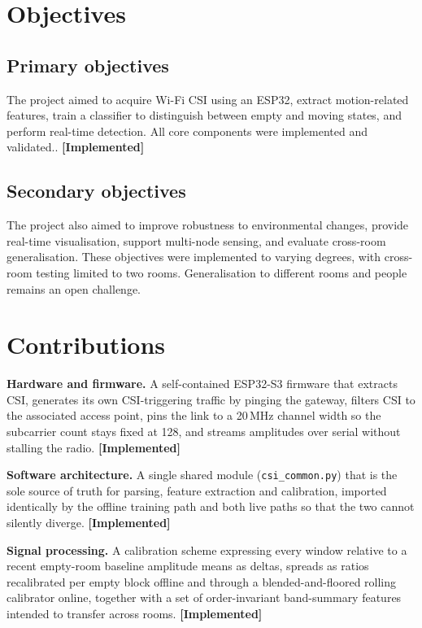 \documentclass[11pt,a4paper,oneside]{report}
\newcommand{\evidencetag}[2]{{\small\sffamily\bfseries\textcolor{#1}{[#2]}}}
\newcommand{\Impl}{\evidencetag{good}{Implemented}}
\newcommand{\code}[1]{\texttt{\small #1}}
\begin{document}
\section{Objectives}

\subsection*{Primary objectives}

The project aimed to acquire Wi-Fi CSI using an ESP32, extract motion-related features, train a classifier to distinguish between empty and moving states, and perform real-time detection. All core components were implemented and validated.. \Impl

\subsection*{Secondary objectives}

The project also aimed to improve robustness to environmental changes, provide real-time visualisation, support multi-node sensing, and evaluate cross-room generalisation. These objectives were implemented to varying degrees, with cross-room testing limited to two rooms. Generalisation to different rooms and people remains an open challenge.

\section{Contributions}

\textbf{Hardware and firmware.} A self-contained ESP32-S3 firmware that
extracts CSI, generates its own CSI-triggering traffic by pinging the gateway,
filters CSI to the associated access point, pins the link to a 20\,MHz channel
width so the subcarrier count stays fixed at 128, and streams amplitudes over
serial without stalling the radio. \Impl

\textbf{Software architecture.} A single shared module (\code{csi\_common.py})
that is the sole source of truth for parsing, feature extraction and
calibration, imported identically by the offline training path and both live
paths so that the two cannot silently diverge. \Impl

\textbf{Signal processing.} A calibration scheme expressing every window
relative to a recent empty-room baseline  amplitude means as deltas, spreads
as ratios  recalibrated per empty block offline and through a
blended-and-floored rolling calibrator online, together with a set of
order-invariant band-summary features intended to transfer across rooms. \Impl
\end{document}
